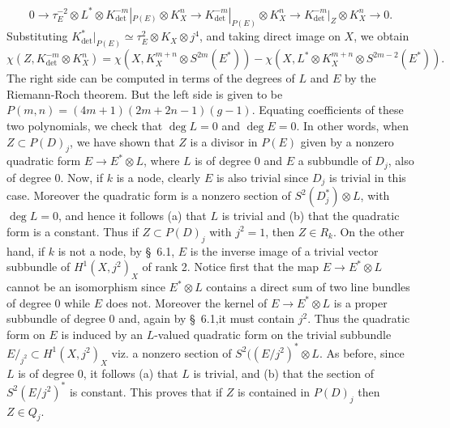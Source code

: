 $$
0\to \tau^{-2}_{E}\otimes L^{*}\otimes K^{-m}_{\det}|_{P(E)}\otimes
K^{n}_{X}\to K^{-m}_{\det}|_{P(E)}\otimes K^{n}_{X}\to
K^{-m}_{\det}|_{Z}\otimes K^{n}_{X}\to 0.
$$
Substituting $K^{*}_{\det}|_{P(E)}\simeq \tau^{2}_{E}\otimes
K_{X}\otimes j^{4}$, and taking direct image on $X$, we obtain
$$
\chi(Z,K^{-m}_{\det}\otimes K^{n}_{X})=\chi(X,K^{m+n}_{X}\otimes
S^{2m}(E^{*}))-\chi (X,L^{*}\otimes K^{m+n}_{X}\otimes
S^{2m-2}(E^{*})). 
$$
The right side can be computed in terms of the degrees of $L$ and $E$
by the Riemann-Roch theorem. But the left side is given to be
$P(m,n)=(4m+1)(2m+2n-1)(g-1)$. Equating coefficients of these two
polynomials, we check that $\deg L=0$ and $\deg E=0$. In other words,
when $Z\subset P(D)_{j}$, we have shown that $Z$ is a divisor in
$P(E)$ given by a nonzero quadratic form $E\to E^{*}\otimes L$, where
$L$ is of degree 0 and $E$ a subbundle of $D_{j}$, also of degree
0. Now, if $k$ is a node, clearly $E$ is also trivial since $D_{j}$ is
trivial in this case. Moreover the quadratic form is a nonzero section
of $S^{2}(D^{*}_{j})\otimes L$, with $\deg L=0$, and hence it follows
(a) that $L$ is trivial and (b) that the quadratic form is a
constant. Thus if $Z\subset P(D)_{j}$ with $j^{2}=1$, then $Z\in
R_{k}$. On the other hand, if $k$ is not a node, by \S\ 6.1, $E$ is
the inverse image of a trivial vector subbundle of
$H^{1}(X,j^{2})_{X}$ of rank 2. Notice first that the map $E\to
E^{*}\otimes L$ cannot be an isomorphism since $E^{*}\otimes L$
contains a direct sum of two line bundles of degree $0$ while $E$ does
not. Moreover the kernel of $E\to E^{*}\otimes L$ is a proper
subbundle of degree 0 and, again by \S\ 6.1,\pageoriginale it must contain
$j^{2}$. Thus the quadratic form on $E$ is induced by an $L$-valued
quadratic form on the trivial subbundle $E/_{j^{2}}\subset
H^{1}(X,j^{2})_{X}$ viz. a nonzero section of
$S^{2}((E/j^{2})^{*}\otimes L$. As before, since $L$ is of degree 0,
it follows (a) that $L$ is trivial, and (b) that the section of
$S^{2}(E/j^{2})^{*}$ is constant. This proves that if $Z$ is contained
in $P(D)_{j}$ then $Z\in Q_{j}$.


